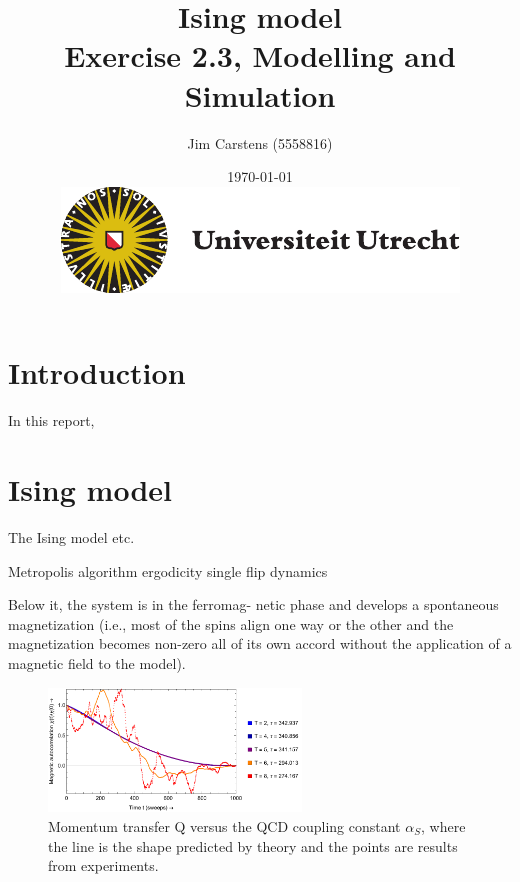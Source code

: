 \documentclass[a4paper]{article}
\title{\textbf{Ising model} \\\large{Exercise 2.3, Modelling and Simulation}}
\author{Jim Carstens (5558816)}
\date{\today \\ \includegraphics[scale=0.4]{uulogo.pdf}}
\begin{document}
\maketitle
\hrulefill
\tableofcontents
\hrulefill
\section*{Introduction}
In this report, 

\section{Ising model}  \label{sec:c}
The Ising model etc.

Metropolis algorithm
ergodicity single flip dynamics


Below it, the system is in the ferromag-
netic phase and develops a spontaneous magnetization (i.e., most of the
spins align one way or the other and the magnetization becomes non-zero all
of its own accord without the application of a magnetic field to the model).

\begin{figure}[h]
	\centering
	\includegraphics[width=0.6\textwidth]{macimage.pdf}
	\caption{Momentum transfer Q versus the QCD coupling constant $\alpha_S$, where the line is the shape predicted by theory and the points are results from experiments.}
	\label{fig:QCD}
\end{figure}


\end{document}
